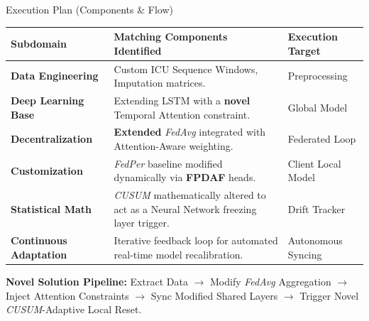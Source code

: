 \documentclass[aspectratio=169, 11pt]{beamer}
\begin{document}
\begin{frame}{Execution Plan (Components \& Flow)}
    \small
    \begin{table}
        \centering
        \begin{tabular}{|p{3.2cm}|p{6.8cm}|p{3cm}|}
            \hline
            \textbf{Subdomain} & \textbf{Matching Components Identified} & \textbf{Execution Target} \\
            \hline
            \textbf{Data Engineering} & Custom ICU Sequence Windows, Imputation matrices. & Preprocessing \\
            \hline
            \textbf{Deep Learning Base} & Extending LSTM with a \textbf{novel} Temporal Attention constraint. & Global Model \\
            \hline
            \textbf{Decentralization} & \textbf{Extended} \textit{FedAvg} integrated with Attention-Aware weighting. & Federated Loop \\
            \hline
            \textbf{Customization} & \textit{FedPer} baseline modified dynamically via \textbf{FPDAF} heads. & Client Local Model \\
            \hline
            \textbf{Statistical Math} & \textit{CUSUM} mathematically altered to act as a Neural Network freezing layer trigger. & Drift Tracker \\
            \hline
            \textbf{Continuous Adaptation} & Iterative feedback loop for automated real-time model recalibration. & Autonomous Syncing \\
            \hline
        \end{tabular}
    \end{table}

    \vspace{0.2cm}
    \textbf{Novel Solution Pipeline:} Extract Data $\rightarrow$ Modify \textit{FedAvg} Aggregation $\rightarrow$ Inject Attention Constraints $\rightarrow$ Sync Modified Shared Layers $\rightarrow$ Trigger Novel \textit{CUSUM}-Adaptive Local Reset.
\end{frame}
\end{document}
